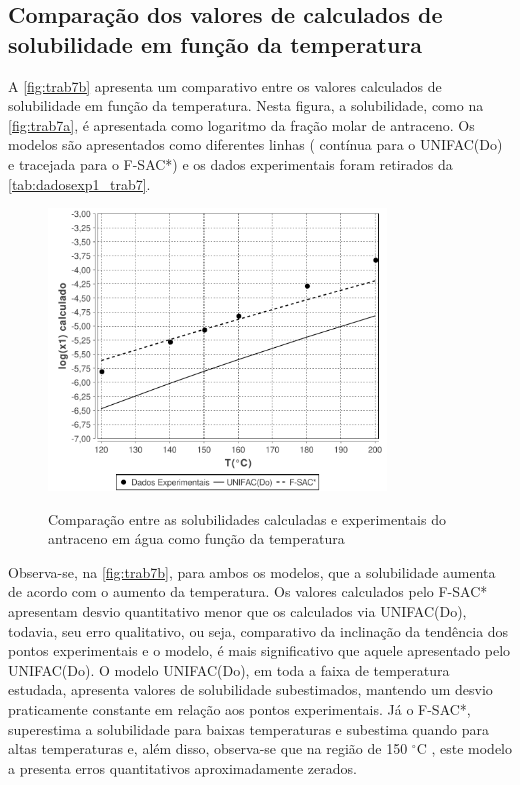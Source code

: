 	
\subsection{Comparação dos valores de calculados de solubilidade em função da
temperatura}
	
A \autoref{fig:trab7b} apresenta um comparativo entre os valores
calculados de solubilidade em função da temperatura. Nesta figura, a
solubilidade, como na \autoref{fig:trab7a}, é apresentada como logaritmo da
fração molar de antraceno. Os modelos são apresentados como diferentes linhas (
contínua para o UNIFAC(Do) e tracejada para o F-SAC*) e os dados experimentais
foram retirados da \autoref{tab:dadosexp1_trab7}.
\clearpage

\begin{figure}
\centering
{\includegraphics[width=0.8\textwidth]{img/trab7b.pdf}} 
\caption{Comparação entre as solubilidades calculadas e experimentais do
antraceno em água como função da temperatura}
\label{fig:trab7b}
\end{figure}

Observa-se, na \autoref{fig:trab7b}, para ambos os modelos, que a solubilidade
aumenta de acordo com o aumento da temperatura. Os valores calculados pelo F-SAC* 
apresentam desvio quantitativo menor que os calculados via UNIFAC(Do), 
todavia, seu erro qualitativo, ou seja, comparativo da inclinação da 
tendência dos pontos experimentais e o modelo, é mais significativo que 
aquele apresentado pelo UNIFAC(Do).
O modelo UNIFAC(Do), em toda a faixa de temperatura estudada, apresenta
valores de solubilidade subestimados, mantendo um desvio praticamente 
constante em relação aos pontos experimentais. Já o F-SAC*, superestima 
a solubilidade para baixas temperaturas e subestima quando para altas 
temperaturas e, além disso, observa-se que na região de 150 $^{\circ}$C , este
modelo a presenta erros quantitativos aproximadamente zerados.

